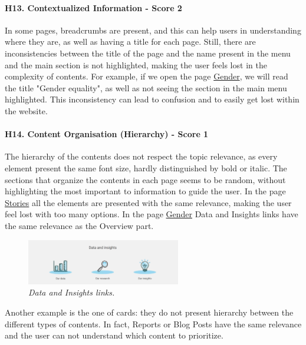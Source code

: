\paragraph*{H13. Contextualized Information  - Score 2}
In some pages, breadcrumbs are present, and this can help users in understanding where they are, as well as having a title for each page. Still, there are inconsistencies between the title of the page and the name present in the menu and the main section is not highlighted, making the user feels lost in the complexity of contents.
For example, if we open the page \href{https://www.unicef.org/gender-equality}{Gender}, we will read the title "Gender equality", as well as not seeing the section in the main menu highlighted. This inconsistency can lead to confusion and to easily get lost within the website.

\paragraph*{H14. Content Organisation (Hierarchy)  - Score 1}
The hierarchy of the contents does not respect the topic relevance, as every element present the same font size, hardly distinguished by bold or italic. The sections that organize the contents in each page seems to be random, without highlighting the most important to information to guide the user.
In the page \href{https://www.unicef.org/stories}{Stories} all the elements are presented with the same relevance, making the user feel lost with too many options.
In the page \href{https://www.unicef.org/gender-equality}{Gender} Data and Insights links have the same relevance as the Overview part.

\begin{figure}[h]
	\centering
	\begin{center}
		\includegraphics[width=0.6\textwidth]{Picture17.png}
	\end{center}
	\captionsetup{font=small}
	\caption{\textit{Data and Insights links.}}
	\label{fig:label17}
\end{figure}

Another example is the one of cards: they do not present hierarchy between the different types of contents. In fact, Reports or Blog Posts have the same relevance and the user can not understand which content to prioritize.

